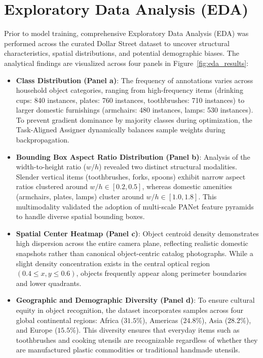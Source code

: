\section{Exploratory Data Analysis (EDA)}
\label{sec:eda}

Prior to model training, comprehensive Exploratory Data Analysis (EDA) was performed across the curated Dollar Street dataset to uncover structural characteristics, spatial distributions, and potential demographic biases. The analytical findings are visualized across four panels in Figure~\ref{fig:eda_results}:

\begin{itemize}
    \item \textbf{Class Distribution (Panel a)}: The frequency of annotations varies across household object categories, ranging from high-frequency items (drinking cups: 840 instances, plates: 760 instances, toothbrushes: 710 instances) to larger domestic furnishings (armchairs: 480 instances, lamps: 530 instances). To prevent gradient dominance by majority classes during optimization, the Task-Aligned Assigner dynamically balances sample weights during backpropagation.
    \item \textbf{Bounding Box Aspect Ratio Distribution (Panel b)}: Analysis of the width-to-height ratio ($w/h$) revealed two distinct structural modalities. Slender vertical items (toothbrushes, forks, spoons) exhibit narrow aspect ratios clustered around $w/h \in [0.2, 0.5]$, whereas domestic amenities (armchairs, plates, lamps) cluster around $w/h \in [1.0, 1.8]$. This multimodality validated the adoption of multi-scale PANet feature pyramids to handle diverse spatial bounding boxes.
    \item \textbf{Spatial Center Heatmap (Panel c)}: Object centroid density demonstrates high dispersion across the entire camera plane, reflecting realistic domestic snapshots rather than canonical object-centric catalog photographs. While a slight density concentration exists in the central optical region $(0.4 \leq x, y \leq 0.6)$, objects frequently appear along perimeter boundaries and lower quadrants.
    \item \textbf{Geographic and Demographic Diversity (Panel d)}: To ensure cultural equity in object recognition, the dataset incorporates samples across four global continental regions: Africa ($31.5\%$), Americas ($24.8\%$), Asia ($28.2\%$), and Europe ($15.5\%$). This diversity ensures that everyday items such as toothbrushes and cooking utensils are recognizable regardless of whether they are manufactured plastic commodities or traditional handmade utensils.
\end{itemize}

